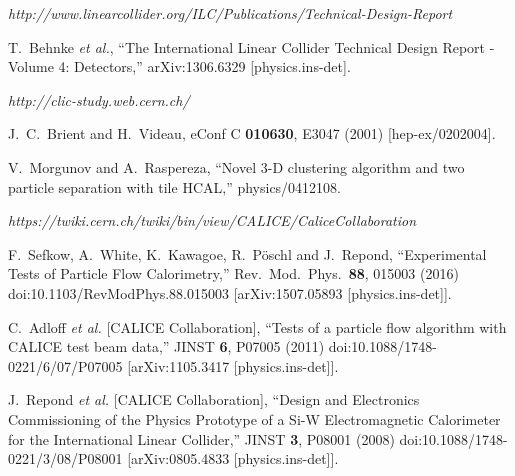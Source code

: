 \documentclass[journal]{IEEEtran}
\begin{document}
\begin{thebibliography}{1}

  \emph{http://www.linearcollider.org/ILC/Publications/Technical-Design-Report}

  T.~Behnke {\it et al.},
  ``The International Linear Collider Technical Design Report - Volume 4: Detectors,''
  arXiv:1306.6329 [physics.ins-det].

  \emph{http://clic-study.web.cern.ch/}

  J.~C.~Brient and H.~Videau,
  eConf C {\bf 010630}, E3047 (2001)
  [hep-ex/0202004].
  
  V.~Morgunov and A.~Raspereza,
  ``Novel 3-D clustering algorithm and two particle separation with tile HCAL,''
  physics/0412108.
  
  \emph{https://twiki.cern.ch/twiki/bin/view/CALICE/CaliceCollaboration}

  F.~Sefkow, A.~White, K.~Kawagoe, R.~Pöschl and J.~Repond,
  ``Experimental Tests of Particle Flow Calorimetry,''
  Rev.\ Mod.\ Phys.\  {\bf 88}, 015003 (2016)
  doi:10.1103/RevModPhys.88.015003
  [arXiv:1507.05893 [physics.ins-det]].

  C.~Adloff {\it et al.} [CALICE Collaboration],
  ``Tests of a particle flow algorithm with CALICE test beam data,''
  JINST {\bf 6}, P07005 (2011)
  doi:10.1088/1748-0221/6/07/P07005
  [arXiv:1105.3417 [physics.ins-det]].
  
  J.~Repond {\it et al.} [CALICE Collaboration],
  ``Design and Electronics Commissioning of the Physics Prototype of a Si-W Electromagnetic Calorimeter for the International Linear Collider,''
  JINST {\bf 3}, P08001 (2008)
  doi:10.1088/1748-0221/3/08/P08001
  [arXiv:0805.4833 [physics.ins-det]].


\end{thebibliography}
\end{document}
